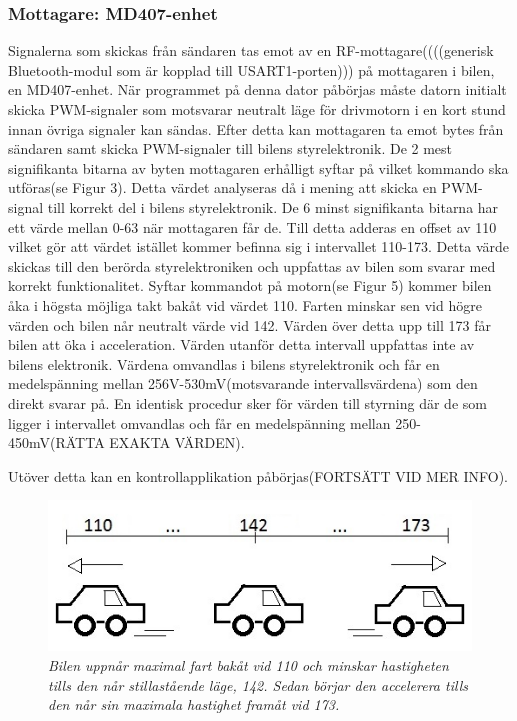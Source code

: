 \documentclass[a4paper]{article}
\begin{document}
\subsubsection{Mottagare: MD407-enhet}
Signalerna som skickas från sändaren tas emot av en RF-mottagare((((generisk Bluetooth-modul som är kopplad till USART1-porten))) på mottagaren i bilen, en MD407-enhet. När programmet på denna dator påbörjas måste datorn initialt skicka PWM-signaler som motsvarar neutralt läge för drivmotorn i en kort stund innan övriga signaler kan sändas. Efter detta kan mottagaren ta emot bytes från sändaren samt skicka PWM-signaler till bilens styrelektronik. De 2 mest signifikanta bitarna av byten mottagaren erhålligt syftar på vilket kommando ska utföras(se Figur 3). Detta värdet analyseras då i mening att skicka en PWM-signal till korrekt del i bilens styrelektronik.  De 6 minst signifikanta bitarna har ett värde mellan 0-63 när mottagaren får de. Till detta adderas en offset av 110 vilket gör att värdet istället kommer befinna sig i intervallet 110-173. Detta värde skickas till den berörda styrelektroniken och uppfattas av bilen som svarar med korrekt funktionalitet. Syftar kommandot på motorn(se Figur 5) kommer bilen åka i högsta möjliga takt bakåt vid värdet 110. Farten minskar sen vid högre värden och bilen når neutralt värde vid 142. Värden över detta upp till 173 får bilen att öka i acceleration. Värden utanför detta intervall uppfattas inte av bilens elektronik. Värdena omvandlas i bilens styrelektronik och får en medelspänning mellan 256V-530mV(motsvarande intervallsvärdena) som den direkt svarar på. En identisk procedur sker för värden till styrning där de som ligger i intervallet omvandlas och får en medelspänning mellan 250-450mV(RÄTTA EXAKTA VÄRDEN). %


Utöver detta kan en kontrollapplikation påbörjas(FORTSÄTT VID MER INFO). 

\begin{figure}[H]
\includegraphics[scale=1]{110-173Car.jpg}
\centering
\caption{\it Bilen uppnår maximal fart bakåt vid 110 och minskar hastigheten tills den når stillastående läge, 142. Sedan börjar den accelerera tills den når sin maximala hastighet framåt vid 173.}
\end{figure} 
\end{document}
